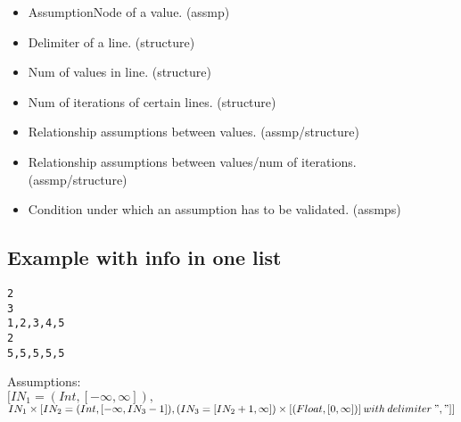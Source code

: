 \documentclass[11pt]{article}
\begin{document}
\begin{itemize}
  \item AssumptionNode of a value. (assmp)
  \item Delimiter of a line. (structure)
  \item Num of values in line. (structure)
  \item Num of iterations of certain lines. (structure)
  \item Relationship assumptions between values. (assmp/structure)
  \item Relationship assumptions between values/num of iterations. (assmp/structure)
  \item Condition under which an assumption has to be validated. (assmps)
\end{itemize}

\subsection{Example with info in one list}

\begin{lstlisting}[numbers=none]
2
3
1,2,3,4,5
2
5,5,5,5,5
\end{lstlisting}

Assumptions:\\
$[IN_1 = (Int, [-\infty, \infty]),$\\
$IN_1 \times [IN_2 = (Int, [-\infty, IN_3-1]), (IN_3 = [IN_2+1, \infty]) \times [(Float, [0, \infty])]\:with\:delimiter\:","]]$\\
\end{document}
